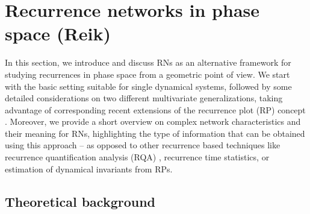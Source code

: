 \section{Recurrence networks in phase space {\bf{(Reik)}}} \label{sec:RecurrenceNt}

In this section, we introduce and discuss RNs as an alternative framework for studying recurrences in phase space from a geometric point of view. We start with the basic setting suitable for single dynamical systems, followed by some detailed considerations on two different multivariate generalizations, taking advantage of corresponding recent extensions \cite{Zbilut1998,romano2004} of the recurrence plot (RP) concept \cite{Eckmann1987,marwan2007}. Moreover, we provide a short overview on complex network characteristics and their meaning for RNs, highlighting the type of information that can be obtained using this approach -- as opposed to other recurrence based techniques like recurrence quantification analysis (RQA) \cite{zbilut92,trulla96}, recurrence time statistics, or estimation of dynamical invariants from RPs.


	\subsection{Theoretical background}

